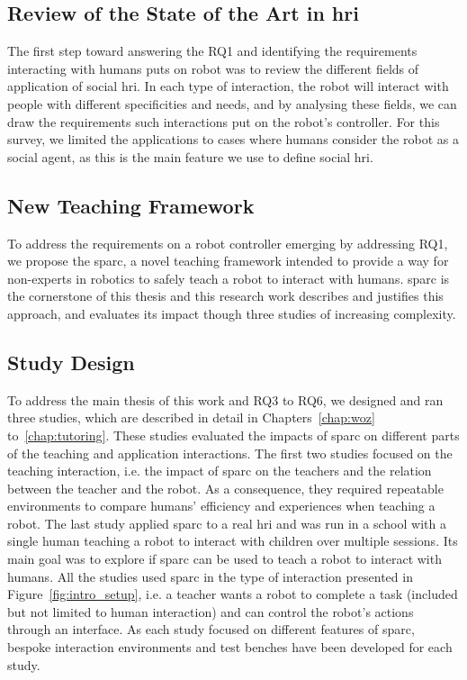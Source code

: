 \subsection{Review of the State of the Art in \gls{hri}}
The first step toward answering the RQ1 and identifying the requirements interacting with humans puts on robot was to review the different fields of application of social \gls{hri}. In each type of interaction, the robot will interact with people with different specificities and needs, and by analysing these fields, we can draw the requirements such interactions put on the robot's controller. For this survey, we limited the applications to cases where humans consider the robot as a social agent, as this is the main feature we use to define social \gls{hri}.

\subsection{New Teaching Framework}
To address the requirements on a robot controller emerging by addressing RQ1, we propose the \gls{sparc}, a novel teaching framework intended to provide a way for non-experts in robotics to safely teach a robot to interact with humans. \gls{sparc} is the cornerstone of this thesis and this research work describes and justifies this approach, and evaluates its impact though three studies of increasing complexity.

\subsection{Study Design} 

To address the main thesis of this work and RQ3 to RQ6, we designed and ran three studies, which are described in detail in Chapters~\ref{chap:woz} to~\ref{chap:tutoring}. These studies evaluated the impacts of \gls{sparc} on different parts of the teaching and application interactions. The first two studies focused on the teaching interaction, i.e. the impact of \gls{sparc} on the teachers and the relation between the teacher and the robot. As a consequence, they required repeatable environments to compare humans' efficiency and experiences when teaching a robot. The last study applied \gls{sparc} to a real \gls{hri} and was run in a school with a single human teaching a robot to interact with children over multiple sessions. Its main goal was to explore if \gls{sparc} can be used to teach a robot to interact with humans. All the studies used \gls{sparc} in the type of interaction presented in Figure~\ref{fig:intro_setup}, i.e. a teacher wants a robot to complete a task (included but not limited to human interaction) and can control the robot's actions through an interface. As each study focused on different features of \gls{sparc}, bespoke interaction environments and test benches have been developed for each study.

